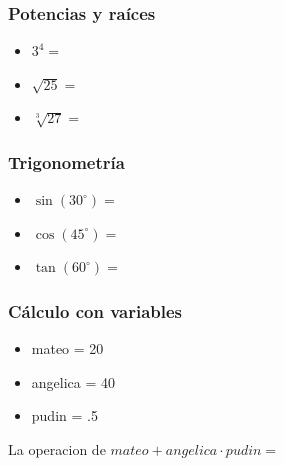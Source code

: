 \documentclass{beamer}
\begin{document}

\begin{frame}
  \frametitle{Potencias y raíces}
  \begin{itemize}
    \item $3^4 =$ \textbf{\potencia}
    \item $\sqrt{25} =$ \textbf{\raizCuadrada}
    \item $\sqrt[3]{27} =$ \textbf{\raizCubo}
  \end{itemize}
\end{frame}


\begin{frame}
  \frametitle{Trigonometría}
  \begin{itemize}
    \item $\sin(30^\circ) =$ \textbf{\seno}
    \item $\cos(45^\circ) =$ \textbf{\coseno}
    \item $\tan(60^\circ) =$ \textbf{\tangente}
  \end{itemize}
\end{frame}
\newcommand{\mateo}{20}
\newcommand{\angelica}{40}
\newcommand{\pudin}{.5}
\pgfmathsetmacro{\ange}{\mateo+  \angelica*\pudin }


\begin{frame}
  \frametitle{Cálculo con variables}
  \begin{itemize}
    \item mateo = \mateo
   \item angelica = \angelica 
   \item pudin = \pudin
  \end{itemize}
  La operacion de $ mateo + angelica \cdot pudin = $ \entero{\ange}  
\end{frame}
\end{document}
